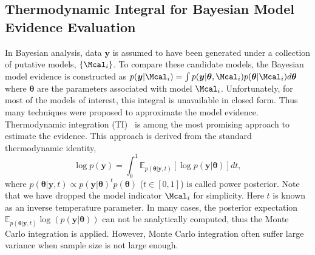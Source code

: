 \documentclass[runningheads]{llncs}
\begin{document}
\subsection{Thermodynamic Integral for Bayesian Model Evidence Evaluation}
In Bayesian analysis, data $\bm{y}$ is assumed to have been generated under a collection of putative models,  $\{\Mcal_i \}$. To compare these candidate models, the  Bayesian model evidence is constructed as 
$
p(\bm{y}|\Mcal_i) = \int p(\bm{y} | \bm{\theta}, \Mcal_i) p(\bm{\theta} |\Mcal_i) d\bm{\theta}
$ 
where $\bm{\theta}$ are the parameters associated with model $\Mcal_i$. Unfortunately, for most of the models of interest, this integral is unavailable in closed form.  Thus many techniques were proposed to approximate the model evidence. Thermodynamic integration (TI)~\cite{frenkel2001understanding} is among the most promising approach to estimate the evidence. This approach is derived from the standard thermodynamic identity, 
\begin{equation}
    \log p(\bm{y}) = \int_{0}^{1} \mathbb{E}_{p(\bm{\theta} | \bm{y}, t)} [\log p(\bm{y} | \bm{\theta} )]dt,
\end{equation}
where $p(\bm{\theta}|\bm{y}, t) \propto p(\bm{y}|\bm{\theta})^t p(\bm{\theta})$ ($t \in [0, 1]$) is called power posterior. Note that we have dropped the model indicator $\Mcal_i$ for simplicity. Here $t$ is known as an inverse temperature parameter. In many cases, the posterior expectation $\mathbb{E}_{p(\bm{\theta} | \bm{y}, t)} \log (p(\bm{y} |\bm{\theta}))$ can not be analytically computed, thus the Monte Carlo integration is applied. However, Monte Carlo integration often suffer large variance when sample size is not large enough. 
\end{document}
